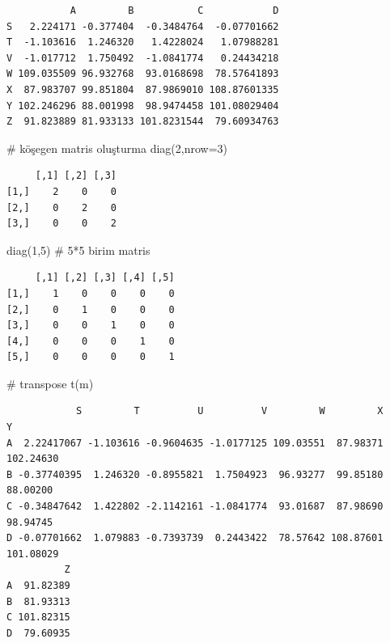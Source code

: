 \documentclass[
  letterpaper,
  DIV=11,
  numbers=noendperiod]{scrreprt}
\newenvironment{Shaded}{\begin{snugshade}}{\end{snugshade}}
\newcommand{\AttributeTok}[1]{\textcolor[rgb]{0.40,0.45,0.13}{#1}}
\newcommand{\CommentTok}[1]{\textcolor[rgb]{0.37,0.37,0.37}{#1}}
\newcommand{\DecValTok}[1]{\textcolor[rgb]{0.68,0.00,0.00}{#1}}
\newcommand{\FunctionTok}[1]{\textcolor[rgb]{0.28,0.35,0.67}{#1}}
\newcommand{\NormalTok}[1]{\textcolor[rgb]{0.00,0.23,0.31}{#1}}
\begin{document}
\begin{verbatim}
           A         B           C            D
S   2.224171 -0.377404  -0.3484764  -0.07701662
T  -1.103616  1.246320   1.4228024   1.07988281
V  -1.017712  1.750492  -1.0841774   0.24434218
W 109.035509 96.932768  93.0168698  78.57641893
X  87.983707 99.851804  87.9869010 108.87601335
Y 102.246296 88.001998  98.9474458 101.08029404
Z  91.823889 81.933133 101.8231544  79.60934763
\end{verbatim}

\begin{Shaded}
\begin{Highlighting}[]
\CommentTok{\# köşegen matris oluşturma}
\FunctionTok{diag}\NormalTok{(}\DecValTok{2}\NormalTok{,}\AttributeTok{nrow=}\DecValTok{3}\NormalTok{)}
\end{Highlighting}
\end{Shaded}

\begin{verbatim}
     [,1] [,2] [,3]
[1,]    2    0    0
[2,]    0    2    0
[3,]    0    0    2
\end{verbatim}

\begin{Shaded}
\begin{Highlighting}[]
\FunctionTok{diag}\NormalTok{(}\DecValTok{1}\NormalTok{,}\DecValTok{5}\NormalTok{) }\CommentTok{\# 5*5 birim matris}
\end{Highlighting}
\end{Shaded}

\begin{verbatim}
     [,1] [,2] [,3] [,4] [,5]
[1,]    1    0    0    0    0
[2,]    0    1    0    0    0
[3,]    0    0    1    0    0
[4,]    0    0    0    1    0
[5,]    0    0    0    0    1
\end{verbatim}

\begin{Shaded}
\begin{Highlighting}[]
\CommentTok{\# transpose}
\FunctionTok{t}\NormalTok{(m)}
\end{Highlighting}
\end{Shaded}

\begin{verbatim}
            S         T          U          V         W         X         Y
A  2.22417067 -1.103616 -0.9604635 -1.0177125 109.03551  87.98371 102.24630
B -0.37740395  1.246320 -0.8955821  1.7504923  96.93277  99.85180  88.00200
C -0.34847642  1.422802 -2.1142161 -1.0841774  93.01687  87.98690  98.94745
D -0.07701662  1.079883 -0.7393739  0.2443422  78.57642 108.87601 101.08029
          Z
A  91.82389
B  81.93313
C 101.82315
D  79.60935
\end{verbatim}
\end{document}
